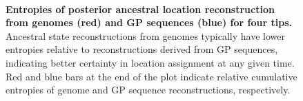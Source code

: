 \documentclass[11pt,oneside,letterpaper]{article}
\begin{document}
\begin{figure}[h]
 \centering
  \\
  \caption{\textbf{Entropies of posterior ancestral location reconstruction from genomes (red) and GP sequences (blue) for four tips.}
  Ancestral state reconstructions from genomes typically have lower entropies relative to reconstructions derived from GP sequences, indicating better certainty in location assignment at any given time.
  Red and blue bars at the end of the plot indicate relative cumulative entropies of genome and GP sequence reconstructions, respectively.
  }
	\label{trace_entropy}
\end{figure}
\end{document}
